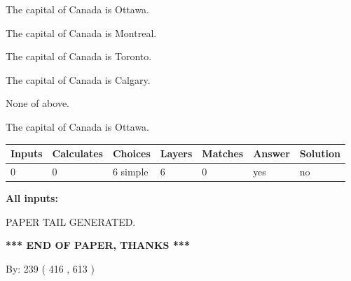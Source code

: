 \documentclass[12pt]{article}
\begin{document}
 
The capital of Canada is Ottawa.
 
 
The capital of Canada is Montreal.
 
 
The capital of Canada is Toronto.
 
 
The capital of Canada is Calgary.
 
 
 None of above.
 
 
\noindent{}
 
 
The capital of Canada is Ottawa.
 
 
\noindent{}
 
 
   
   
   
   
\noindent\begin{tabular}{|l|l|l|l|l|l|l|}
 \hline
Inputs & Calculates & Choices & Layers & Matches & Answer & Solution \\ \hline
 0  & 
 0  & 
 6
  simple  
  & 
 6  & 
 0  & 
  yes & 
  no 
  \\ \hline
 \end{tabular}
   
   
   
   
\noindent{}
   
   
   
   
\noindent\vspace{0.1in}\hspace{-0.08in} {\textbf{\Large{All inputs: }}}
   
   
   
   
   
   
 \vspace{0.2in}
 
   
   
\vspace{2.0in} PAPER TAIL GENERATED.
   
   
   
   
\vspace{1.0in} 
{\textbf{\large{ *** END OF PAPER, THANKS *** }}} 
   
   
\hspace{1.0in} By: 
 239 ( 416 ,  613 )
   
\end{document}
